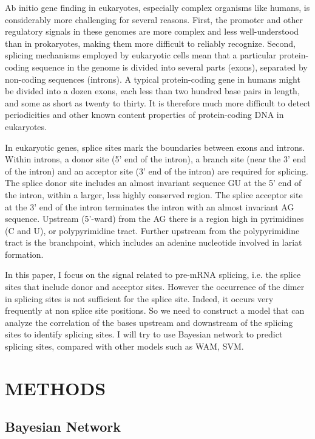 \documentclass{gapd}
\begin{document}
Ab initio gene finding in eukaryotes, especially complex organisms like
humans, is considerably more challenging for several reasons. First, the
promoter and other regulatory signals in these genomes are more complex
and less well-understood than in prokaryotes, making them more difficult
to reliably recognize. Second, splicing mechanisms employed by
eukaryotic cells mean that a particular protein-coding sequence in the
genome is divided into several parts (exons), separated by non-coding
sequences (introns). A typical protein-coding gene in humans might be
divided into a dozen exons, each less than two hundred base pairs in
length, and some as short as twenty to thirty. It is therefore much more
difficult to detect periodicities and other known content properties of
protein-coding DNA in eukaryotes.

In eukaryotic genes, splice sites mark the boundaries between exons and
introns. Within introns, a donor site (5' end of the intron), a branch
site (near the 3' end of the intron) and an acceptor site (3' end of the
intron) are required for splicing. The splice donor site includes an
almost invariant sequence GU at the 5' end of the intron, within a
larger, less highly conserved region. The splice acceptor site at the 3'
end of the intron terminates the intron with an almost invariant AG
sequence. Upstream (5'-ward) from the AG there is a region high in
pyrimidines (C and U), or polypyrimidine tract. Further upstream from
the polypyrimidine tract is the branchpoint, which includes an adenine
nucleotide involved in lariat formation.

In this paper, I focus on the signal related to pre-mRNA splicing, i.e.
the splice sites that include donor and acceptor sites. However the
occurrence of the dimer in splicing sites is not sufficient for the
splice site. Indeed, it occurs very frequently at non splice site
positions. So we need to construct a model that can analyze the
correlation of the bases upstream and downstream of the splicing sites
to identify splicing sites. I will try to use Bayesian network to
predict splicing sites, compared with other models such as WAM, SVM.

\section{METHODS}\label{methods}

\subsection{Bayesian Network}\label{bayesian-network}
\end{document}
